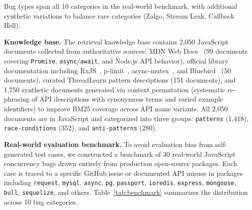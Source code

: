 \documentclass[runningheads]{llncs}
\begin{document}
Bug types span all 10 categories in the real-world benchmark, with
additional synthetic variations to balance rare categories
(Zalgo, Stream Leak, Callback Hell).

\textbf{Knowledge base.}
The retrieval knowledge base contains 2,050 JavaScript documents collected
from authoritative sources: MDN Web Docs~\cite{mdn} (99 documents covering
\texttt{Promise}, \texttt{async}/\texttt{await}, and Node.js API
behavior), official library documentation including RxJS~\cite{rxjs},
p-limit~\cite{plimit}, async-mutex~\cite{asyncmutex}, and
Bluebird~\cite{bluebird} (50 documents), curated ThreadLearn
pattern descriptions (151 documents), and 1,750 synthetic documents
generated via context permutation (systematic re-phrasing of API descriptions with synonymous
terms and varied example identifiers) to improve BM25
coverage across API name variants.
All 2,050 documents are in JavaScript and categorized into three groups:
\texttt{patterns} (1,418), \texttt{race-conditions} (352), and
\texttt{anti-patterns} (280).

\textbf{Real-world evaluation benchmark.}
To avoid evaluation bias from self-generated test cases, we constructed
a benchmark of 30 real-world JavaScript concurrency bugs drawn entirely
from production open-source packages.
Each case is traced to a specific GitHub issue or documented API misuse
in packages including \texttt{request}, \texttt{mysql}, \texttt{async},
\texttt{pg}, \texttt{passport}, \texttt{ioredis}, \texttt{express},
\texttt{mongoose}, \texttt{bull}, \texttt{sequelize}, and others.
Table~\ref{tab:benchmark} summarizes the distribution across 10 bug
categories.
\end{document}
